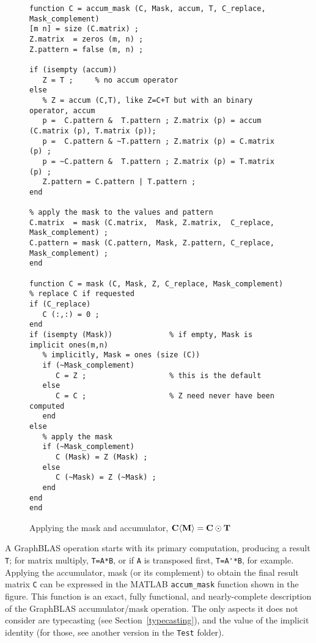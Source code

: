 \documentclass[12pt]{article}
\begin{document}
\begin{figure}
\begin{mdframed}[leftmargin=-0.4in,userdefinedwidth=5.8in]
{\footnotesize
\begin{verbatim}
function C = accum_mask (C, Mask, accum, T, C_replace, Mask_complement)
[m n] = size (C.matrix) ;
Z.matrix  = zeros (m, n) ;
Z.pattern = false (m, n) ;

if (isempty (accum))
   Z = T ;     % no accum operator
else
   % Z = accum (C,T), like Z=C+T but with an binary operator, accum
   p =  C.pattern &  T.pattern ; Z.matrix (p) = accum (C.matrix (p), T.matrix (p));
   p =  C.pattern & ~T.pattern ; Z.matrix (p) = C.matrix (p) ;
   p = ~C.pattern &  T.pattern ; Z.matrix (p) = T.matrix (p) ;
   Z.pattern = C.pattern | T.pattern ;
end

% apply the mask to the values and pattern
C.matrix  = mask (C.matrix,  Mask, Z.matrix,  C_replace, Mask_complement) ;
C.pattern = mask (C.pattern, Mask, Z.pattern, C_replace, Mask_complement) ;
end

function C = mask (C, Mask, Z, C_replace, Mask_complement)
% replace C if requested
if (C_replace)
   C (:,:) = 0 ;
end
if (isempty (Mask))             % if empty, Mask is implicit ones(m,n)
   % implicitly, Mask = ones (size (C))
   if (~Mask_complement)
      C = Z ;                   % this is the default
   else
      C = C ;                   % Z need never have been computed
   end
else
   % apply the mask
   if (~Mask_complement)
      C (Mask) = Z (Mask) ;
   else
      C (~Mask) = Z (~Mask) ;
   end
end
end \end{verbatim} }
\end{mdframed}
\caption{Applying the mask and accumulator, ${\bf C \langle M \rangle = C \odot T}$\label{fig_accummask}}
\end{figure}

A GraphBLAS operation starts with its primary
computation, producing a result \verb'T'; for matrix multiply, \verb'T=A*B', or
if \verb'A' is transposed first, \verb"T=A'*B", for example.  Applying the
accumulator, mask (or its complement) to obtain the final result matrix
\verb'C' can be expressed in the MATLAB \verb'accum_mask' function shown in the
figure.  This function is an exact, fully functional, and nearly-complete
description of the GraphBLAS accumulator/mask operation.  The only aspects it
does not consider are typecasting (see Section~\ref{typecasting}), and the
value of the implicit identity (for those, see another version in the
\verb'Test' folder).
\end{document}
